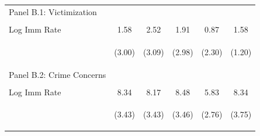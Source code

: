 \begin{center}
\begin{tabular}{lccccc}
\noalign{\smallskip}Panel B.1: Victimization &  &  &  &  & \\
 & \begin{footnotesize}\end{footnotesize} & \begin{footnotesize}\end{footnotesize} & \begin{footnotesize}\end{footnotesize} & \begin{footnotesize}\end{footnotesize} & \begin{footnotesize}\end{footnotesize}\\
\noalign{\smallskip}Log Imm Rate & 1.58 & 2.52 & 1.91 & 0.87 & 1.58\\
 & \begin{footnotesize}(3.00)\end{footnotesize} & \begin{footnotesize}(3.09)\end{footnotesize} & \begin{footnotesize}(2.98)\end{footnotesize} & \begin{footnotesize}(2.30)\end{footnotesize} & \begin{footnotesize}(1.20)\end{footnotesize}\\
\noalign{\smallskip}Panel B.2: Crime Concerns &  &  &  &  & \\
 & \begin{footnotesize}\end{footnotesize} & \begin{footnotesize}\end{footnotesize} & \begin{footnotesize}\end{footnotesize} & \begin{footnotesize}\end{footnotesize} & \begin{footnotesize}\end{footnotesize}\\
\noalign{\smallskip}Log Imm Rate & 8.34 & 8.17 & 8.48 & 5.83 & 8.34\\
 & \begin{footnotesize}(3.43)\end{footnotesize} & \begin{footnotesize}(3.43)\end{footnotesize} & \begin{footnotesize}(3.46)\end{footnotesize} & \begin{footnotesize}(2.76)\end{footnotesize} & \begin{footnotesize}(3.75)\end{footnotesize}\\

\end{tabular}
\end{center}
